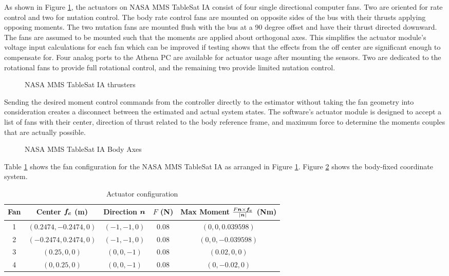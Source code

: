 As shown in Figure \ref{fig:TSatThrusters}, the actuators on NASA MMS TableSat IA consist of four single directional computer fans.  Two are oriented for rate control and two for nutation control.  The body rate control fans are mounted on opposite sides of the bus with their thrusts applying opposing moments.  The two nutation fans are mounted flush with the bus at a 90 degree offset and have their thrust directed downward.  The fans are assumed to be mounted such that the moments are applied about orthogonal axes.  This simplifies the actuator module's voltage input calculations for each fan which can be improved if testing shows that the effects from the off center are significant enough to compensate for.  Four analog ports to the Athena PC are available for actuator usage after mounting the sensors.  Two are dedicated to the rotational fans to provide full rotational control, and the remaining two provide limited nutation control.
\begin{figure}[H]
  \centerline{}
  \caption{NASA MMS TableSat IA thrusters}
  \label{fig:TSatThrusters}
\end{figure}
Sending the desired moment control commands from the controller directly to the estimator without taking the fan geometry into consideration creates a disconnect between the estimated and actual system states.  The software's actuator module is designed to accept a list of fans with their center, direction of thrust related to the body reference frame, and maximum force to determine the moments couples that are actually possible.
\begin{figure}[H]
  \centerline{}
  \caption{NASA MMS TableSat IA Body Axes}
  \label{fig:TableSatBodyAxes}
\end{figure}
Table \ref{tbl:ActuatorConfiguration} shows the fan configuration for the NASA MMS TableSat IA as arranged in Figure \ref{fig:TSatThrusters}.  Figure \ref{fig:TableSatBodyAxes} shows the body-fixed coordinate system.
\begin{table}[H]
  \centering
  \begin{tabular}{c|c|c|c|c}
    Fan & Center $\boldsymbol{f_c}$ (m) & Direction $\boldsymbol{n}$ & $F$ (N) & Max Moment $\frac{F \boldsymbol{n} \times \boldsymbol{f_c}}{|\boldsymbol{n}|}$ (Nm) \\ \hline
    1 & $(0.2474, -0.2474, 0)$ & $(-1, -1, 0)$ & 0.08 & $(0, 0, 0.039598)$ \\
    2 & $(-0.2474, 0.2474, 0)$ & $(-1, -1, 0)$ & 0.08 & $(0, 0, -0.039598)$ \\
    3 & $(0.25, 0, 0)$ & $(0, 0, -1)$ & 0.08 & $(0.02, 0, 0)$ \\
    4 & $(0, 0.25, 0)$ & $(0, 0, -1)$ & 0.08 & $(0, -0.02, 0)$ \\
  \end{tabular}
  \caption{Actuator configuration}
  \label{tbl:ActuatorConfiguration}
\end{table}
